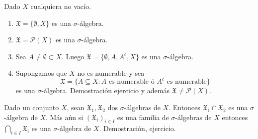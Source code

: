 \begin{eg}
    Dado $X$ cualquiera no vacío.
    \begin{enumerate}
        \item $\mathfrak{X} = \{ \emptyset, X \}$ es una $\sigma$-álgebra.
        \item $\mathfrak{X} = \mathcal{P}(X)$ es una $\sigma$-álgebra.
        \item Sea $A \neq \emptyset \subset X$. Luego $\mathfrak{X} = \{ \emptyset, A, A^c, X \}$ es una $\sigma$-álgebra.
        \item Supongamos que $X$ no es numerable y sea
              \begin{equation}
                  \mathfrak{X} = \{ A \subseteq X : A \text{ es numerable ó } A^c \text{ es numerable} \}
              \end{equation}
              es una $\sigma$-álgebra. Demostración ejercicio y además $\mathfrak{X} \neq \mathcal{P}(X)$.
    \end{enumerate}
\end{eg}

\begin{lemma}
    Dado un conjunto $X$, sean $\mathfrak{X}_1, \mathfrak{X}_2$ dos $\sigma$-álgebras de $X$. Entonces $\mathfrak{X}_1 \cap \mathfrak{X}_2$ es una $\sigma$-álgebra de $X$.
    Más aún si $(\mathfrak{X}_i)_{i \in I}$ es una familia de $\sigma$-álgebras de $X$ entonces $\bigcap_{i \in I} \mathfrak{X}_i$ es una $\sigma$-álgebra de $X$.
    Demostración, ejercicio.
\end{lemma}

